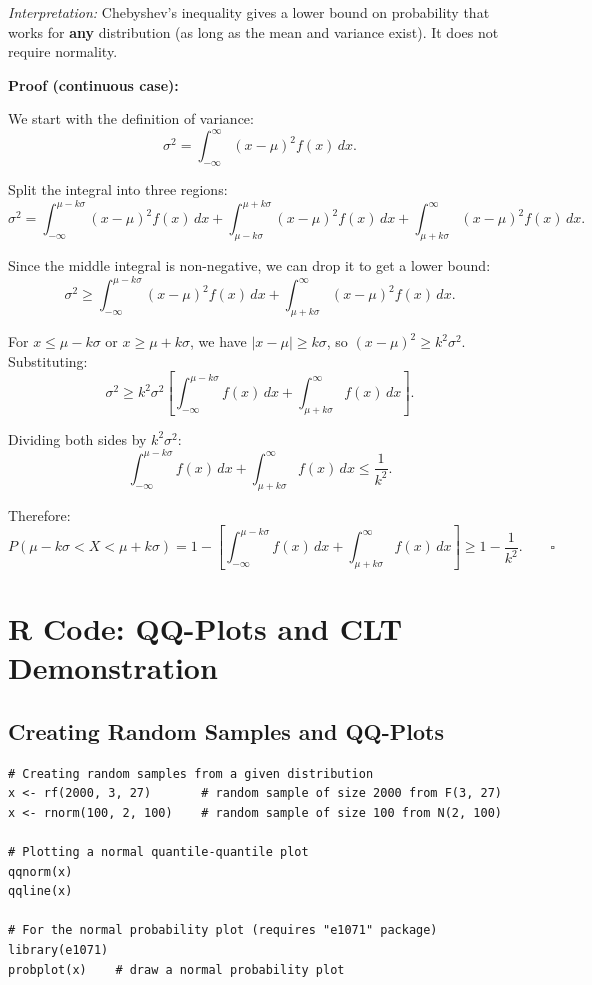\documentclass[10pt]{report}
\begin{document}
\textit{Interpretation:} Chebyshev's inequality gives a lower bound on probability that works for \textbf{any} distribution (as long as the mean and variance exist). It does not require normality.

\medskip

\textbf{Proof (continuous case):}

We start with the definition of variance:
\[
\sigma^2 = \int_{-\infty}^{\infty} (x - \mu)^2 f(x)\,dx.
\]

Split the integral into three regions:
\[
\sigma^2 = \int_{-\infty}^{\mu - k\sigma} (x-\mu)^2 f(x)\,dx + \int_{\mu-k\sigma}^{\mu+k\sigma} (x-\mu)^2 f(x)\,dx + \int_{\mu+k\sigma}^{\infty} (x-\mu)^2 f(x)\,dx.
\]

Since the middle integral is non-negative, we can drop it to get a lower bound:
\[
\sigma^2 \geq \int_{-\infty}^{\mu - k\sigma} (x-\mu)^2 f(x)\,dx + \int_{\mu+k\sigma}^{\infty} (x-\mu)^2 f(x)\,dx.
\]

For $x \leq \mu - k\sigma$ or $x \geq \mu + k\sigma$, we have $|x - \mu| \geq k\sigma$, so $(x - \mu)^2 \geq k^2\sigma^2$. Substituting:
\[
\sigma^2 \geq k^2\sigma^2 \left[\int_{-\infty}^{\mu - k\sigma} f(x)\,dx + \int_{\mu+k\sigma}^{\infty} f(x)\,dx\right].
\]

Dividing both sides by $k^2\sigma^2$:
\[
\int_{-\infty}^{\mu - k\sigma} f(x)\,dx + \int_{\mu+k\sigma}^{\infty} f(x)\,dx \leq \frac{1}{k^2}.
\]

Therefore:
\[
P\!\left(\mu - k\sigma < X < \mu + k\sigma\right) = 1 - \left[\int_{-\infty}^{\mu-k\sigma} f(x)\,dx + \int_{\mu+k\sigma}^{\infty} f(x)\,dx\right] \geq 1 - \frac{1}{k^2}. \qquad \square
\]

\section{R Code: QQ-Plots and CLT Demonstration}

\subsection{Creating Random Samples and QQ-Plots}

\begin{lstlisting}
# Creating random samples from a given distribution
x <- rf(2000, 3, 27)       # random sample of size 2000 from F(3, 27)
x <- rnorm(100, 2, 100)    # random sample of size 100 from N(2, 100)

# Plotting a normal quantile-quantile plot
qqnorm(x)
qqline(x)

# For the normal probability plot (requires "e1071" package)
library(e1071)
probplot(x)    # draw a normal probability plot
\end{lstlisting}
\end{document}
